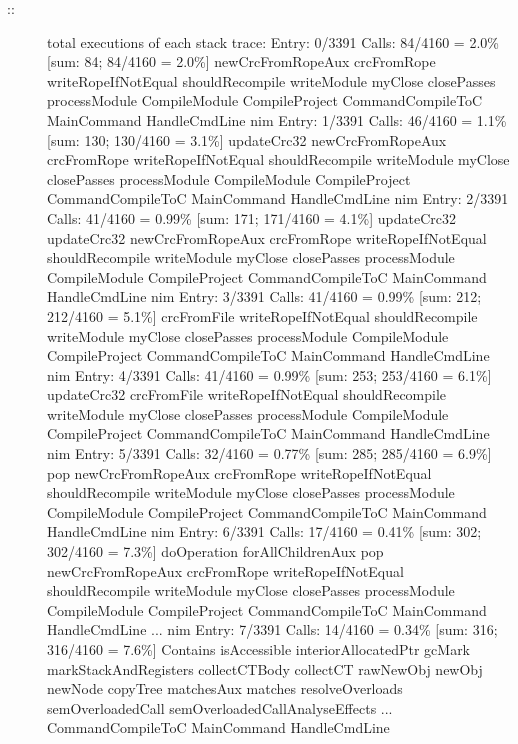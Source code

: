 \begin{description}
\item[::]
total executions of each stack trace: Entry: 0/3391 Calls: 84/4160 =
2.0\% {[}sum: 84; 84/4160 = 2.0\%{]} newCrcFromRopeAux crcFromRope
writeRopeIfNotEqual shouldRecompile writeModule myClose closePasses
processModule CompileModule CompileProject CommandCompileToC MainCommand
HandleCmdLine nim Entry: 1/3391 Calls: 46/4160 = 1.1\% {[}sum: 130;
130/4160 = 3.1\%{]} updateCrc32 newCrcFromRopeAux crcFromRope
writeRopeIfNotEqual shouldRecompile writeModule myClose closePasses
processModule CompileModule CompileProject CommandCompileToC MainCommand
HandleCmdLine nim Entry: 2/3391 Calls: 41/4160 = 0.99\% {[}sum: 171;
171/4160 = 4.1\%{]} updateCrc32 updateCrc32 newCrcFromRopeAux
crcFromRope writeRopeIfNotEqual shouldRecompile writeModule myClose
closePasses processModule CompileModule CompileProject CommandCompileToC
MainCommand HandleCmdLine nim Entry: 3/3391 Calls: 41/4160 = 0.99\%
{[}sum: 212; 212/4160 = 5.1\%{]} crcFromFile writeRopeIfNotEqual
shouldRecompile writeModule myClose closePasses processModule
CompileModule CompileProject CommandCompileToC MainCommand HandleCmdLine
nim Entry: 4/3391 Calls: 41/4160 = 0.99\% {[}sum: 253; 253/4160 =
6.1\%{]} updateCrc32 crcFromFile writeRopeIfNotEqual shouldRecompile
writeModule myClose closePasses processModule CompileModule
CompileProject CommandCompileToC MainCommand HandleCmdLine nim Entry:
5/3391 Calls: 32/4160 = 0.77\% {[}sum: 285; 285/4160 = 6.9\%{]} pop
newCrcFromRopeAux crcFromRope writeRopeIfNotEqual shouldRecompile
writeModule myClose closePasses processModule CompileModule
CompileProject CommandCompileToC MainCommand HandleCmdLine nim Entry:
6/3391 Calls: 17/4160 = 0.41\% {[}sum: 302; 302/4160 = 7.3\%{]}
doOperation forAllChildrenAux pop newCrcFromRopeAux crcFromRope
writeRopeIfNotEqual shouldRecompile writeModule myClose closePasses
processModule CompileModule CompileProject CommandCompileToC MainCommand
HandleCmdLine ... nim Entry: 7/3391 Calls: 14/4160 = 0.34\% {[}sum: 316;
316/4160 = 7.6\%{]} Contains isAccessible interiorAllocatedPtr gcMark
markStackAndRegisters collectCTBody collectCT rawNewObj newObj newNode
copyTree matchesAux matches resolveOverloads semOverloadedCall
semOverloadedCallAnalyseEffects ... CommandCompileToC MainCommand
HandleCmdLine
\end{description}
